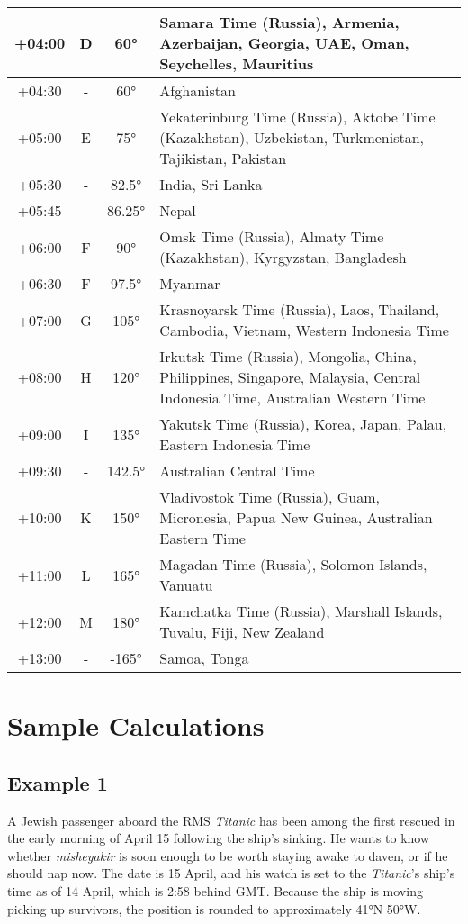 \begin{footnotesize}
\begin{tabular}{c | c | c | p{}}
	+04:00&D&60°&Samara Time (Russia), Armenia, Azerbaijan, Georgia, UAE, Oman, Seychelles, Mauritius\\\hline
	+04:30& - &60°&Afghanistan\\\hline
	+05:00&E&75°&Yekaterinburg Time (Russia), Aktobe Time (Kazakhstan), Uzbekistan, Turkmenistan, Tajikistan, Pakistan\\\hline
	+05:30& - &82.5°&India, Sri Lanka\\\hline
	+05:45& - &86.25°&Nepal\\\hline
	+06:00&F&90°&Omsk Time (Russia), Almaty Time (Kazakhstan), Kyrgyzstan, Bangladesh\\\hline
	+06:30&F&97.5°&Myanmar\\\hline
	+07:00&G&105°&Krasnoyarsk Time (Russia), Laos, Thailand, Cambodia, Vietnam, Western Indonesia Time\\\hline
	+08:00&H&120°&Irkutsk Time (Russia), Mongolia, China, Philippines, Singapore, Malaysia, Central Indonesia Time, Australian Western Time\\\hline
	+09:00&I&135°&Yakutsk Time (Russia), Korea, Japan, Palau, Eastern Indonesia Time\\\hline
	+09:30& - &142.5°&Australian Central Time\\\hline
	+10:00&K&150°&Vladivostok Time (Russia), Guam, Micronesia, Papua New Guinea, Australian Eastern Time\\\hline
	+11:00&L&165°&Magadan Time (Russia), Solomon Islands, Vanuatu\\\hline
	+12:00&M&180°&Kamchatka Time (Russia), Marshall Islands, Tuvalu, Fiji, New Zealand\\\hline
	+13:00& - &-165°&Samoa, Tonga\\\hline
\end{tabular}\end{footnotesize}

\section{Sample Calculations}

\subsection{Example 1}

A Jewish passenger aboard the RMS \textit{Titanic} has been among the first rescued in the early morning of April 15 following the ship's sinking. He wants to know whether \textit{misheyakir} is soon enough to be worth staying awake to daven, or if he should nap now. The date is 15 April, and his watch is set to the \textit{Titanic}'s ship's time as of 14 April, which is 2:58 behind GMT.  Because the ship is moving picking up survivors, the position is rounded to approximately 41°N 50°W.

